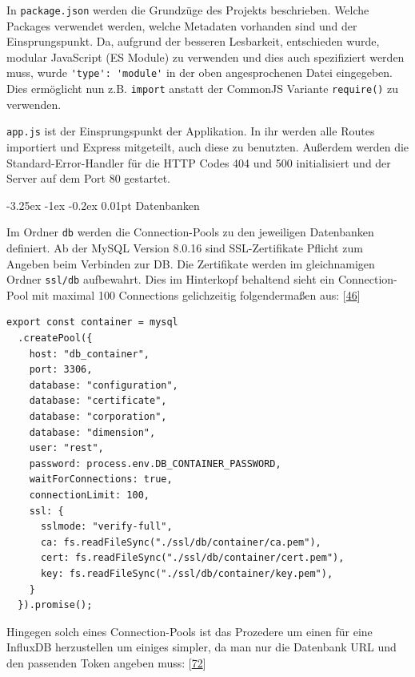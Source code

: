\documentclass[
    headings=optiontotocandhead,%
    twoside,
    numbers=noenddot,%
    12pt, %
    titlepage, %
    parskip=full, %
    listof=leveldown, 
    numbers=noenddot, %
    a4paper,DIV=14,
    BCOR=15mm,
]{scrbook}
\makeatletter
\newcommand{\passthrough}[1]{#1}
\renewcommand\paragraph{\@startsection{paragraph}{4}{\z@}%
    {-3.25ex \@plus -1ex \@minus -0.2ex}%
    {0.01pt}%
    {\raggedsection\normalfont\sectfont\nobreak\size@paragraph}%
  }
\makeatother
\begin{document}
In \passthrough{\lstinline!package.json!} werden die Grundzüge des
Projekts beschrieben. Welche Packages verwendet werden, welche Metadaten
vorhanden sind und der Einsprungspunkt. Da, aufgrund der besseren
Lesbarkeit, entschieden wurde, modular JavaScript (ES Module) zu
verwenden und dies auch spezifiziert werden muss, wurde
\passthrough{\lstinline!'type': 'module'!} in der oben angesprochenen
Datei eingegeben. Dies ermöglicht nun z.B.
\passthrough{\lstinline!import!} anstatt der CommonJS Variante
\passthrough{\lstinline!require()!} zu verwenden.

\passthrough{\lstinline!app.js!} ist der Einsprungspunkt der
Applikation. In ihr werden alle Routes importiert und Express
mitgeteilt, auch diese zu benutzten. Außerdem werden die
Standard-Error-Handler für die HTTP Codes 404 und 500 initialisiert und
der Server auf dem Port 80 gestartet.

\hypertarget{datenbanken}{%
\paragraph{Datenbanken}\label{datenbanken}}

Im Ordner \passthrough{\lstinline!db!} werden die Connection-Pools zu
den jeweiligen Datenbanken definiert. Ab der MySQL Version 8.0.16 sind
SSL-Zertifikate Pflicht zum Angeben beim Verbinden zur DB. Die
Zertifikate werden im gleichnamigen Ordner
\passthrough{\lstinline!ssl/db!} aufbewahrt. Dies im Hinterkopf
behaltend sieht ein Connection-Pool mit maximal 100 Connections
gelichzeitig folgendermaßen aus:
{[}\protect\hyperlink{ref-medium-rest-api}{46}{]}

\begin{lstlisting}[caption={MySQL Connection Pool für die Container DB}]
export const container = mysql
  .createPool({
    host: "db_container",
    port: 3306,
    database: "configuration",
    database: "certificate",
    database: "corporation",
    database: "dimension",
    user: "rest",
    password: process.env.DB_CONTAINER_PASSWORD,
    waitForConnections: true,
    connectionLimit: 100,
    ssl: {
      sslmode: "verify-full",
      ca: fs.readFileSync("./ssl/db/container/ca.pem"),
      cert: fs.readFileSync("./ssl/db/container/cert.pem"),
      key: fs.readFileSync("./ssl/db/container/key.pem"),
    }
  }).promise();
\end{lstlisting}

Hingegen solch eines Connection-Pools ist das Prozedere um einen für
eine InfluxDB herzustellen um einiges simpler, da man nur die Datenbank
URL und den passenden Token angeben muss:
{[}\protect\hyperlink{ref-influxdb-javascript}{72}{]}
\end{document}
